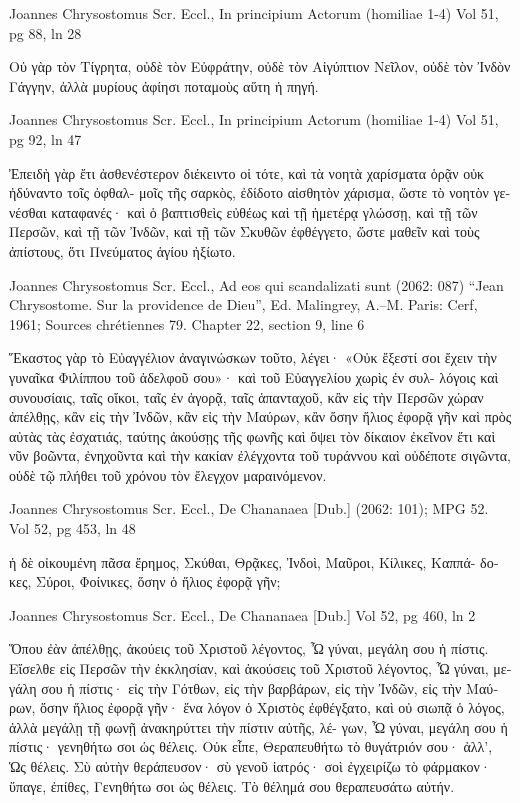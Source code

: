 \documentclass[12pt,letterpaper,twoside,final]{memoir}
\begin{document}
\begin{greek}
Joannes Chrysostomus Scr. Eccl., In principium Actorum (homiliae 1-4) 
Vol 51, pg 88, ln 28

                           Οὐ γὰρ τὸν Τίγρητα, οὐδὲ 
τὸν Εὐφράτην, οὐδὲ τὸν Αἰγύπτιον Νεῖλον, οὐδὲ τὸν 
Ἰνδὸν Γάγγην, ἀλλὰ μυρίους ἀφίησι ποταμοὺς αὕτη 
ἡ πηγή. 



Joannes Chrysostomus Scr. Eccl., In principium Actorum (homiliae 1-4) 
Vol 51, pg 92, ln 47

Ἐπειδὴ γὰρ ἔτι ἀσθενέστερον διέκειντο οἱ τότε, καὶ 
τὰ νοητὰ χαρίσματα ὁρᾷν οὐκ ἠδύναντο τοῖς ὀφθαλ-
μοῖς τῆς σαρκὸς, ἐδίδοτο αἰσθητὸν χάρισμα, ὥστε τὸ 
νοητὸν γενέσθαι καταφανές· καὶ ὁ βαπτισθεὶς εὐθέως 
καὶ τῇ ἡμετέρᾳ γλώσσῃ, καὶ τῇ τῶν Περσῶν, καὶ τῇ 
τῶν Ἰνδῶν, καὶ τῇ τῶν Σκυθῶν ἐφθέγγετο, ὥστε 
μαθεῖν καὶ τοὺς ἀπίστους, ὅτι Πνεύματος ἁγίου ἠξίωτο. 



Joannes Chrysostomus Scr. Eccl., Ad eos qui scandalizati sunt (2062: 087)
“Jean Chrysostome. Sur la providence de Dieu”, Ed. Malingrey, A.–M.
Paris: Cerf, 1961; Sources chrétiennes 79.
Chapter 22, section 9, line 6

Ἕκαστος γὰρ τὸ Εὐαγγέλιον ἀναγινώσκων τοῦτο, 
λέγει· «Οὐκ ἔξεστί σοι ἔχειν τὴν γυναῖκα Φιλίππου 
τοῦ ἀδελφοῦ σου»· καὶ τοῦ Εὐαγγελίου χωρὶς ἐν συλ-
λόγοις καὶ συνουσίαις, ταῖς οἴκοι, ταῖς ἐν ἀγορᾷ, ταῖς 
ἁπανταχοῦ, κἂν εἰς τὴν Περσῶν χώραν ἀπέλθῃς, κἂν εἰς 
τὴν Ἰνδῶν, κἂν εἰς τὴν Μαύρων, κἂν ὅσην ἥλιος ἐφορᾷ 
γῆν καὶ πρὸς αὐτὰς τὰς ἐσχατιάς, ταύτης ἀκούσῃς τῆς 
φωνῆς καὶ ὄψει τὸν δίκαιον ἐκεῖνον ἔτι καὶ νῦν βοῶντα, 
ἐνηχοῦντα καὶ τὴν κακίαν ἐλέγχοντα τοῦ τυράννου καὶ 
οὐδέποτε σιγῶντα, οὐδὲ τῷ πλήθει τοῦ χρόνου τὸν ἔλεγχον 
μαραινόμενον. 



Joannes Chrysostomus Scr. Eccl., De Chananaea [Dub.] (2062: 101); MPG 52.
Vol 52, pg 453, ln 48

                   ἡ δὲ οἰκουμένη πᾶσα ἔρημος, 
Σκύθαι, Θρᾷκες, Ἰνδοὶ, Μαῦροι, Κίλικες, Καππά-
δοκες, Σύροι, Φοίνικες, ὅσην ὁ ἥλιος ἐφορᾷ γῆν; 



Joannes Chrysostomus Scr. Eccl., De Chananaea [Dub.] 
Vol 52, pg 460, ln 2

              Ὅπου ἐὰν ἀπέλθῃς, ἀκούεις τοῦ 
Χριστοῦ λέγοντος, Ὦ γύναι, μεγάλη σου ἡ πίστις. 
Εἴσελθε εἰς Περσῶν τὴν ἐκκλησίαν, καὶ ἀκούσεις τοῦ    
Χριστοῦ λέγοντος, Ὦ γύναι, μεγάλη σου ἡ πίστις· 
εἰς τὴν Γότθων, εἰς τὴν βαρβάρων, εἰς τὴν Ἰνδῶν, 
εἰς τὴν Μαύρων, ὅσην ἥλιος ἐφορᾷ γῆν· ἕνα λόγον ὁ 
Χριστὸς ἐφθέγξατο, καὶ οὐ σιωπᾷ ὁ λόγος, ἀλλὰ 
μεγάλῃ τῇ φωνῇ ἀνακηρύττει τὴν πίστιν αὐτῆς, λέ-
γων, Ὦ γύναι, μεγάλη σου ἡ πίστις· γενηθήτω 
σοι ὡς θέλεις. Οὐκ εἶπε, Θεραπευθήτω τὸ θυγάτριόν 
σου· ἀλλ', Ὡς θέλεις. Σὺ αὐτὴν θεράπευσον· σὺ 
γενοῦ ἰατρός· σοὶ ἐγχειρίζω τὸ φάρμακον· ὕπαγε, 
ἐπίθες, Γενηθήτω σοι ὡς θέλεις. Τὸ θέλημά σου 
θεραπευσάτω αὐτήν. 




\end{greek}
\end{document}

